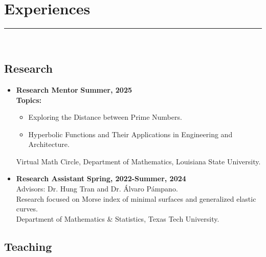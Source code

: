 \documentclass[12pt]{book}
\begin{document}
\section*{Experiences}
\rule{\textwidth}{1pt}\\
\subsection*{Research}

\begin{itemize}
	\item \textbf{Research Mentor} \hfill \textbf{Summer, 2025}\\
	\textbf{Topics:}
	\begin{itemize}
		\item Exploring the Distance between Prime Numbers.
		\item Hyperbolic Functions and Their Applications in Engineering and Architecture. 
	\end{itemize}
	Virtual Math Circle, Department of Mathematics, Louisiana State University.

	\item \textbf{Research Assistant} \hfill \textbf{Spring, 2022-Summer, 2024}\\
 Advisors:  Dr. Hung Tran and Dr. \'Alvaro P\'ampano.  \\
Research focused on Morse index of minimal surfaces and generalized elastic curves. \\
Department of Mathematics \& Statistics, Texas Tech University. 

\end{itemize}



\subsection*{Teaching}
\end{document}
